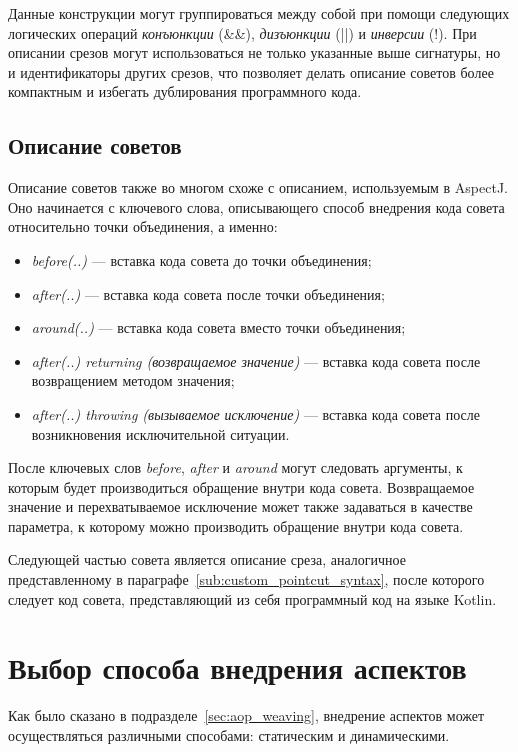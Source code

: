 Данные конструкции могут группироваться между собой при помощи следующих
логических операций \textit{конъюнкции} (\&\&),  \textit{дизъюнкции} (||)  и
\textit{инверсии} (!).
При описании срезов могут использоваться не только указанные выше сигнатуры, но
и идентификаторы других срезов, что позволяет делать описание советов более
компактным и избегать дублирования программного кода.
\subsection{Описание советов}
\label{sub:custom_advice_syntax}
Описание советов также во многом схоже с описанием, используемым в AspectJ.
Оно начинается с ключевого слова, описывающего способ внедрения
кода совета относительно точки объединения, а именно:
\begin{itemize}
	\item \textit{before(..)} --- вставка кода совета до точки объединения;
	\item \textit{after(..)} --- вставка кода совета после точки объединения;
	\item \textit{around(..)} --- вставка кода совета вместо точки объединения;
	\item \textit{after(..) returning (возвращаемое значение)} --- вставка кода совета после возвращением методом значения;
	\item \textit{after(..) throwing (вызываемое исключение)} --- вставка кода совета после возникновения исключительной ситуации.
\end{itemize}
После ключевых слов \textit{before}, \textit{after} и \textit{around} могут следовать аргументы, к которым будет производиться обращение внутри кода совета.
Возвращаемое значение и перехватываемое исключение может также задаваться в качестве параметра, к которому можно производить обращение внутри кода совета.

Следующей частью совета является описание среза, аналогичное представленному в
параграфе~\ref{sub:custom_pointcut_syntax}, после которого следует код совета,
представляющий из себя программный код на языке Kotlin.
\section{Выбор способа внедрения аспектов}
\label{sec:advice_weaving_choice}
Как было сказано в подразделе~\ref{sec:aop_weaving}, внедрение аспектов может осуществляться различными способами: статическим и динамическими.

